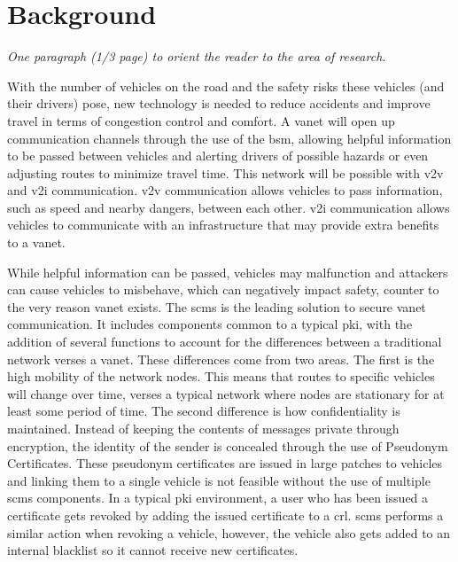 \documentclass {article}
\newcommand{\sechint}[1]{\small{\emph{#1}} \bigskip}
\begin{document}
\tableofcontents
\pagebreak

\section{Background}{\sechint{One paragraph (1/3 page) to orient the reader to the area of research.}}

With the number of vehicles on the road and the safety risks these vehicles (and their drivers) pose, new technology is needed to reduce accidents and improve travel in terms of congestion control and comfort. A \gls{vanet} will open up communication channels through the use of the \gls{bsm}, allowing helpful information to be passed between vehicles and alerting drivers of possible hazards or even adjusting routes to minimize travel time. This network will be possible with \gls{v2v} and \gls{v2i} communication. \gls{v2v}  communication allows vehicles to pass information, such as speed and nearby dangers, between each other. \gls{v2i}  communication allows vehicles to communicate with an infrastructure that may provide extra benefits to a \gls{vanet}.

While helpful information can be passed, vehicles may malfunction and attackers can cause vehicles to misbehave, which can negatively impact safety, counter to the very reason \gls{vanet} exists. The \gls{scms} is the leading solution to secure \gls{vanet} communication. It includes components common to a typical \gls{pki}, with the addition of several functions to account for the differences between a traditional network verses a \gls{vanet}. These differences come from two areas. The first is the high mobility of the network nodes. This means that routes to specific vehicles will change over time, verses a typical network where nodes are stationary for at least some period of time. The second difference is how confidentiality is maintained. Instead of keeping the contents of messages private through encryption, the identity of the sender is concealed through the use of Pseudonym Certificates. These pseudonym certificates are issued in large patches to vehicles and linking them to a single vehicle is not feasible without the use of multiple \gls{scms} components. In a typical \gls{pki} environment, a user who has been issued a certificate gets revoked by adding the issued certificate to a \gls{crl}. \gls{scms} performs a similar action when revoking a vehicle, however, the vehicle also gets added to an internal blacklist so it cannot receive new certificates.
\end{document}
